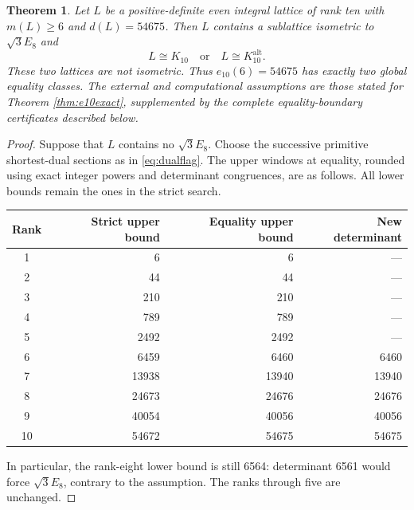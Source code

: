 \documentclass[11pt,a4paper]{article}
\newtheorem{theorem}{Theorem}[section]
\theoremstyle{remark}\newtheorem{remark}[theorem]{Remark}
\newcommand{\Kalt}{K_{10}^{\mathrm{alt}}}
\begin{document}
\begin{theorem}\label{thm:global10equality}
Let $L$ be a positive-definite even integral lattice of rank ten with $m(L)\ge6$ and $d(L)=54675$. Then $L$ contains a sublattice isometric to $\sqrt3E_8$ and
\[
L\cong K_{10}\quad\text{or}\quad L\cong\Kalt.
\]
These two lattices are not isometric. Thus $e_{10}(6)=54675$ has exactly two global equality classes. The external and computational assumptions are those stated for Theorem \ref{thm:e10exact}, supplemented by the complete equality-boundary certificates described below.
\end{theorem}

\begin{proof}
Suppose that $L$ contains no $\sqrt3E_8$. Choose the successive primitive shortest-dual sections as in \eqref{eq:dualflag}. The upper windows at equality, rounded using exact integer powers and determinant congruences, are as follows. All lower bounds remain the ones in the strict search.
\begin{center}
\begin{tabular}{crrr}
\toprule
Rank & Strict upper bound & Equality upper bound & New determinant\\\midrule
1&6&6&---\\
2&44&44&---\\
3&210&210&---\\
4&789&789&---\\
5&2492&2492&---\\
6&6459&6460&6460\\
7&13938&13940&13940\\
8&24673&24676&24676\\
9&40054&40056&40056\\
10&54672&54675&54675\\
\bottomrule
\end{tabular}
\end{center}
In particular, the rank-eight lower bound is still 6564: determinant 6561 would force $\sqrt3E_8$, contrary to the assumption. The ranks through five are unchanged.


\end{proof}
\end{document}
